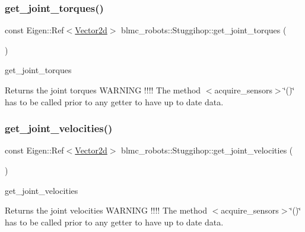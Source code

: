 \subsubsection{\texorpdfstring{get\+\_\+joint\+\_\+torques()}{get\_joint\_torques()}}
{\footnotesize\ttfamily const Eigen\+::\+Ref$<$\hyperlink{common__header_8hpp_acb6916bc8c9fe9d98c484fd4cc201447}{Vector2d}$>$ blmc\+\_\+robots\+::\+Stuggihop\+::get\+\_\+joint\+\_\+torques (\begin{DoxyParamCaption}{ }\end{DoxyParamCaption})\hspace{0.3cm}{\ttfamily [inline]}}



get\+\_\+joint\+\_\+torques 

\begin{DoxyReturn}{Returns}
the joint torques W\+A\+R\+N\+I\+NG !!!! The method $<$acquire\+\_\+sensors$>$\char`\"{}()\char`\"{} has to be called prior to any getter to have up to date data. 
\end{DoxyReturn}
\mbox{\label{classblmc__robots_1_1Stuggihop_ad06f6d6a3cb3f85848fce1178bc60dd1}} 
\subsubsection{\texorpdfstring{get\+\_\+joint\+\_\+velocities()}{get\_joint\_velocities()}}
{\footnotesize\ttfamily const Eigen\+::\+Ref$<$\hyperlink{common__header_8hpp_acb6916bc8c9fe9d98c484fd4cc201447}{Vector2d}$>$ blmc\+\_\+robots\+::\+Stuggihop\+::get\+\_\+joint\+\_\+velocities (\begin{DoxyParamCaption}{ }\end{DoxyParamCaption})\hspace{0.3cm}{\ttfamily [inline]}}



get\+\_\+joint\+\_\+velocities 

\begin{DoxyReturn}{Returns}
the joint velocities W\+A\+R\+N\+I\+NG !!!! The method $<$acquire\+\_\+sensors$>$\char`\"{}()\char`\"{} has to be called prior to any getter to have up to date data. 
\end{DoxyReturn}
\mbox{\label{classblmc__robots_1_1Stuggihop_a5a68ae4700c53672c30d373cc3b5b66c}} 
